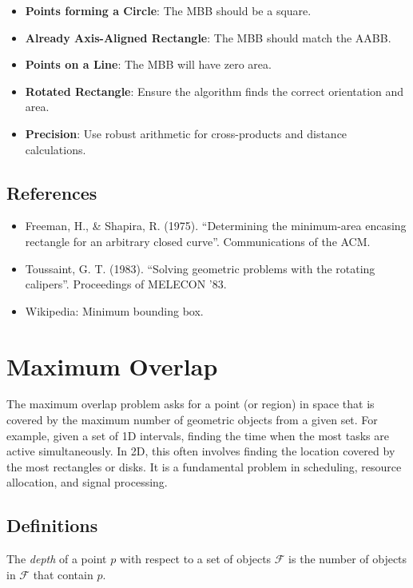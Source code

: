 \begin{itemize}
\item \textbf{Points forming a Circle}: The MBB should be a square.
\item \textbf{Already Axis-Aligned Rectangle}: The MBB should match the AABB.
\item \textbf{Points on a Line}: The MBB will have zero area.
\item \textbf{Rotated Rectangle}: Ensure the algorithm finds the correct orientation and area.
\item \textbf{Precision}: Use robust arithmetic for cross-products and distance calculations.
\end{itemize}

\subsection{References}

\begin{itemize}
\item Freeman, H., \& Shapira, R. (1975). ``Determining the minimum-area encasing rectangle for an arbitrary closed curve''. Communications of the ACM.
\item Toussaint, G. T. (1983). ``Solving geometric problems with the rotating calipers''. Proceedings of MELECON '83.
\item Wikipedia: Minimum bounding box.
\end{itemize}


\section{Maximum Overlap}
\label{sec:maximum_overlap}

The maximum overlap problem asks for a point (or region) in space that is covered by the maximum number of geometric objects from a given set. For example, given a set of 1D intervals, finding the time when the most tasks are active simultaneously. In 2D, this often involves finding the location covered by the most rectangles or disks. It is a fundamental problem in scheduling, resource allocation, and signal processing.

\subsection{Definitions}

\begin{definition}\label{def:depth_of_point}
The \emph{depth} of a point $p$ with respect to a set of objects $\mathcal{F}$ is the number of objects in $\mathcal{F}$ that contain $p$.
\end{definition}

